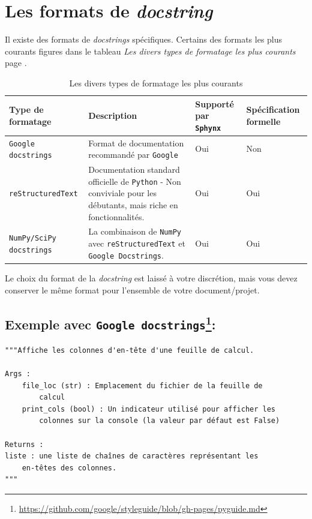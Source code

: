 \documentclass[a4paper,12pt]{book}
\begin{document}
\section{Les formats de \textit{docstring}}
Il existe des formats de \textit{docstrings} spécifiques. Certains des formats les plus courants figures dans le tableau \textit{Les divers types de formatage les plus courants} page \pageref{formatsdocstring}.
\begin{table}[h]
\begin{center}
\begin{tabular}{|p{3.7cm}|p{5cm}|p{2.3cm}|p{2.3cm}|}
\hline
\textbf{Type de formatage} & \textbf{Description} & \textbf{Supporté par \texttt{Sphynx}} & \textbf{Spécification formelle} \\
\hline
\texttt{Google docstrings} & Format de documentation recommandé par \texttt{Google} & Oui & Non \\
\hline
\texttt{reStructuredText} & Documentation standard officielle de \texttt{Python} - Non conviviale pour les débutants, mais riche en fonctionnalités. & Oui & Oui \\
\hline
\texttt{NumPy/SciPy docstrings} & La combinaison de \texttt{NumPy} avec \texttt{reStructuredText} et \texttt{Google Docstrings}. & Oui & Oui \\
\hline
\end{tabular}
\caption{Les divers types de formatage les plus courants}\label{formatsdocstring}
\end{center}
\end{table}
\medskip

Le choix du format de la \textit{docstring} est laissé à votre discrétion, mais vous devez conserver le même format pour l'ensemble de votre document/projet.
\medskip

\subsection*{Exemple avec \texttt{Google docstrings}\footnote{\url{https://github.com/google/styleguide/blob/gh-pages/pyguide.md}}:}
\begin{lstlisting}
"""Affiche les colonnes d'en-tête d'une feuille de calcul.

Args :
    file_loc (str) : Emplacement du fichier de la feuille de 
        calcul
    print_cols (bool) : Un indicateur utilisé pour afficher les 
    	colonnes sur la console (la valeur par défaut est False)

Returns :
liste : une liste de chaînes de caractères représentant les 
    en-têtes des colonnes.
"""
\end{lstlisting}
\medskip
\end{document}
